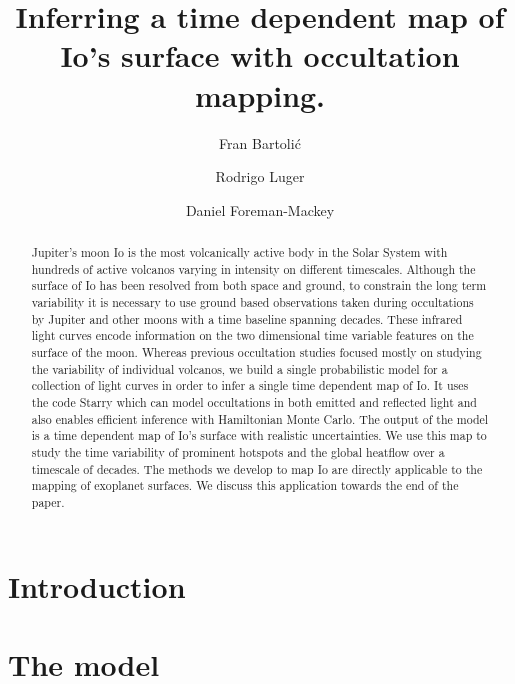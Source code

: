 \documentclass[modern]{aastex62}
\begin{document}
\title{Inferring a time dependent map of Io's surface with occultation mapping.}

\author{Fran Bartoli\'c}
\author{Rodrigo Luger}
\author{Daniel Foreman-Mackey}
%

\begin{abstract} 
Jupiter's moon Io is the most volcanically active body in the Solar System with hundreds of active volcanos varying in intensity on different timescales. 
Although the surface of Io has been resolved from both space and ground, to constrain the long term variability it is necessary to use ground based observations taken during occultations by Jupiter and other moons with a time baseline spanning decades.
These infrared light curves encode information %
on the two dimensional time variable features on the surface of the moon.
Whereas previous occultation studies focused mostly on studying the variability of individual volcanos, we build a single probabilistic model for a collection of light curves in order to infer a single time dependent map of Io.
    It uses the code Starry \href{https://rodluger.github.io/starry/}{\color{linkcolor}\faGithub} which can model occultations in both emitted and reflected light and also enables efficient inference with Hamiltonian Monte Carlo.
The output of the model is a time dependent map of Io's surface with realistic uncertainties.
We use this map to study the time variability of prominent hotspots and the global heatflow over a timescale of decades. The methods we develop to map Io are directly applicable to the mapping of exoplanet surfaces. 
We discuss this application towards the end of the paper.
    \href{https://github.com/fbartolic/volcano}{\color{linkcolor}\faGithub}
\end{abstract}

%
\section{Introduction}
\section{The model}
\end{document}
